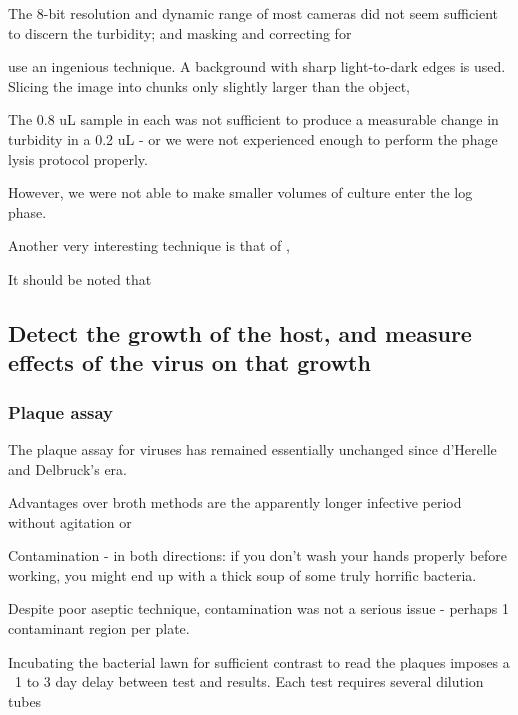 \documentclass[paper.tex]{subfiles}
\begin{document}
The 8-bit resolution and dynamic range of most cameras did not seem sufficient to discern the turbidity; and masking and correcting for 

\cite{Vision2016} use an ingenious technique. A background with sharp light-to-dark edges is used. Slicing the image into chunks only slightly larger than the object,


The 0.8 uL sample in each was not sufficient to produce a measurable change in turbidity in a 0.2 uL - or we were not experienced enough to perform the phage lysis protocol properly.

However, we were not able to make smaller volumes of culture enter the log phase.




Another very interesting technique is that of \cite{Study2003}, 

















It should be noted that 

\subsection{Detect the growth of the host, and measure effects of the virus on that growth}

\subsubsection{Plaque assay}

The plaque assay for viruses has remained essentially unchanged since d'Herelle and Delbruck's era.

Advantages over broth methods are the apparently longer infective period without agitation or 

Contamination - in both directions: if you don’t wash your hands properly before working, you might end up with a thick soup of some truly horrific bacteria.

Despite poor aseptic technique, contamination was not a serious issue - perhaps 1 contaminant region per plate.

Incubating the bacterial lawn for sufficient contrast to read the plaques imposes a ~1 to 3 day delay between test and results. Each test requires several dilution tubes
\end{document}
